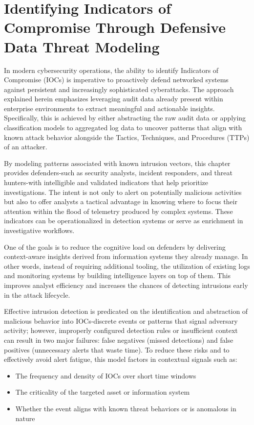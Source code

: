 \section{Identifying Indicators of Compromise Through Defensive Data Threat Modeling}
In modern cybersecurity operations, the ability to identify Indicators of Compromise (IOCs) is imperative to proactively defend networked systems against persistent and increasingly sophisticated cyberattacks. The approach explained herein emphasizes leveraging audit data already present within enterprise environments to extract meaningful and actionable insights. Specifically, this is achieved by either abstracting the raw audit data or applying classification models to aggregated log data to uncover patterns that align with known attack behavior alongside the Tactics, Techniques, and Procedures (TTPs) of an attacker.

By modeling patterns associated with known intrusion vectors, this chapter provides defenders-such as security analysts, incident responders, and threat hunters-with intelligible and validated indicators that help prioritize investigations. The intent is not only to alert on potentially malicious activities but also to offer analysts a tactical advantage in knowing where to focus their attention within the flood of telemetry produced by complex systems. These indicators can be operationalized in detection systems or serve as enrichment in investigative workflows.

One of the goals is to reduce the cognitive load on defenders by delivering context-aware insights derived from information systems they already manage. In other words, instead of requiring additional tooling, the utilization of existing logs and monitoring systems by building intelligence layers on top of them. This improves analyst efficiency and increases the chances of detecting intrusions early in the attack lifecycle.

Effective intrusion detection is predicated on the identification and abstraction of malicious behavior into IOCs-discrete events or patterns that signal adversary activity; however, improperly configured detection rules or insufficient context can result in two major failures: false negatives (missed detections) and false positives (unnecessary alerts that waste time). To reduce these risks and to effectively avoid alert fatigue, this model factors in contextual signals such as:

\begin{itemize}
    \item The frequency and density of IOCs over short time windows
    \item The criticality of the targeted asset or information system
    \item Whether the event aligns with known threat behaviors or is anomalous in nature
\end{itemize}

